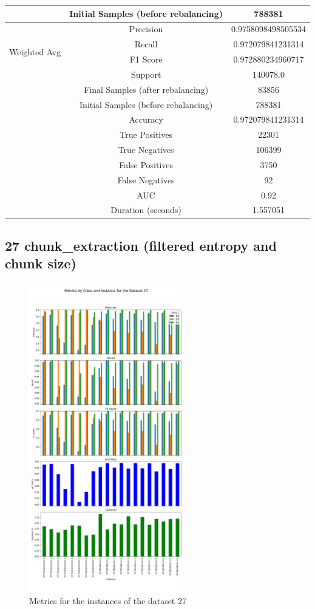 \begin{longtable}{|c|c|c|}
 & Initial Samples (before rebalancing) & 788381 \\
\hline
\multirow{4}{*}{Weighted Avg} & Precision & 0.9758098498505534 \\
 & Recall & 0.972079841231314 \\
 & F1 Score & 0.972880234960717 \\
 & Support & 140078.0 \\
 & Final Samples (after rebalancing) & 83856 \\
 & Initial Samples (before rebalancing) & 788381 \\
\hline
& Accuracy & 0.972079841231314 \\ \hline
& True Positives & 22301 \\ \hline
& True Negatives & 106399 \\ \hline
& False Positives & 3750 \\ \hline
& False Negatives & 92 \\ \hline
& AUC & 0.92 \\ \hline
& Duration (seconds) & 1.557051 \\ \hline
\end{longtable}


\subsection{27 chunk\_extraction (filtered entropy and chunk size)}

\begin{figure}[H]
\centering
\includegraphics[width=0.6\textwidth]{img/annexes/27/27 - Metrics.png}
\caption{Metrics for the instances of the dataset 27}
\label{fig:27_metrics_instance}
\end{figure}

